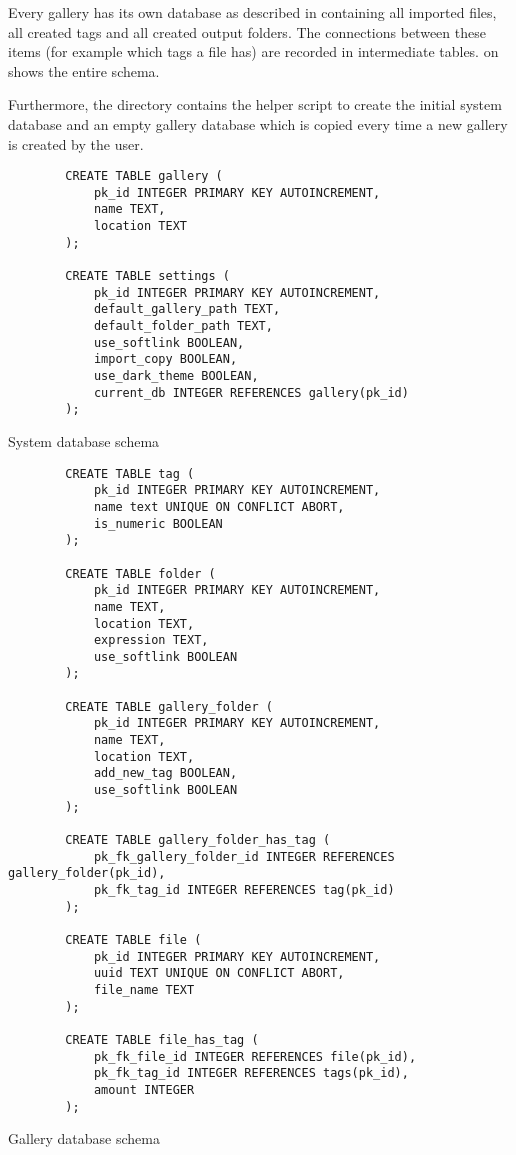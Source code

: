 Every gallery has its own database as described in 
containing all imported files, all created tags and all created output folders.
The connections between these items (for example which tags a file has) are
recorded in intermediate tables.  on
 shows the entire schema.

Furthermore, the directory contains the helper script  to
create the initial system database and an empty gallery database which is
copied every time a new gallery is created by the user.

\begin{listing}[!ht]
	\begin{verbatim}
		CREATE TABLE gallery (
			pk_id INTEGER PRIMARY KEY AUTOINCREMENT,
			name TEXT,
			location TEXT
		);

		CREATE TABLE settings (
			pk_id INTEGER PRIMARY KEY AUTOINCREMENT,
			default_gallery_path TEXT,
			default_folder_path TEXT,
			use_softlink BOOLEAN,
			import_copy BOOLEAN,
			use_dark_theme BOOLEAN,
			current_db INTEGER REFERENCES gallery(pk_id)
		);
	\end{verbatim}
	\caption{System database schema}
	\label{lst:db:system}
\end{listing}

\begin{listing}[!ht]
	\begin{verbatim}
		CREATE TABLE tag (
			pk_id INTEGER PRIMARY KEY AUTOINCREMENT,
			name text UNIQUE ON CONFLICT ABORT,
			is_numeric BOOLEAN
		);

		CREATE TABLE folder (
			pk_id INTEGER PRIMARY KEY AUTOINCREMENT,
			name TEXT,
			location TEXT,
			expression TEXT,
			use_softlink BOOLEAN
		);

		CREATE TABLE gallery_folder (
			pk_id INTEGER PRIMARY KEY AUTOINCREMENT,
			name TEXT,
			location TEXT,
			add_new_tag BOOLEAN,
			use_softlink BOOLEAN
		);

		CREATE TABLE gallery_folder_has_tag (
			pk_fk_gallery_folder_id INTEGER REFERENCES gallery_folder(pk_id),
			pk_fk_tag_id INTEGER REFERENCES tag(pk_id)
		);

		CREATE TABLE file (
			pk_id INTEGER PRIMARY KEY AUTOINCREMENT,
			uuid TEXT UNIQUE ON CONFLICT ABORT,
			file_name TEXT
		);

		CREATE TABLE file_has_tag (
			pk_fk_file_id INTEGER REFERENCES file(pk_id),
			pk_fk_tag_id INTEGER REFERENCES tags(pk_id),
			amount INTEGER
		);
	\end{verbatim}
	\caption{Gallery database schema}
	\label{lst:db:gallery}
\end{listing}
\FloatBarrier

